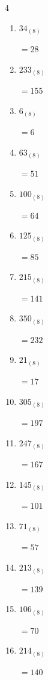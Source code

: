\begin{multicols}{4}
\begin{enumerate}
  \item $34_{(8)}$

        $=28$

  \item $233_{(8)}$

        $=155$

  \item $6_{(8)}$

        $=6$

  \item $63_{(8)}$

        $=51$

  \item $100_{(8)}$

        $=64$

  \item $125_{(8)}$

        $=85$

  \item $215_{(8)}$

        $=141$

  \item $350_{(8)}$

        $=232$

  \item $21_{(8)}$

        $=17$

  \item $305_{(8)}$

        $=197$

  \item $247_{(8)}$

        $=167$

  \item $145_{(8)}$

        $=101$

  \item $71_{(8)}$

        $=57$

  \item $213_{(8)}$

        $=139$

\columnbreak %

\resetques

  \item $106_{(8)}$

        $=70$

  \item $214_{(8)}$

        $=140$


\end{enumerate}
\end{multicols}
